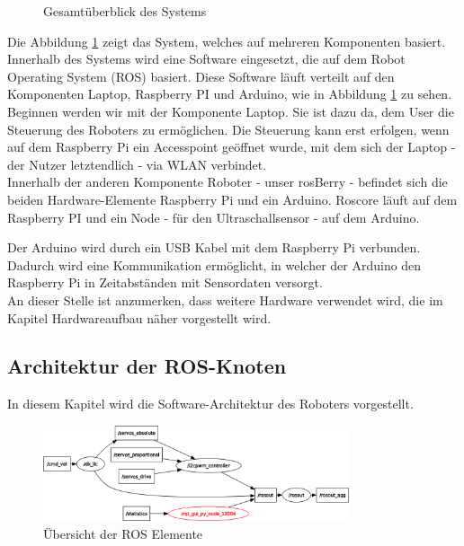 \documentclass[conference]{IEEEtran}
\begin{document}
	\begin{figure}[!ht]
		\centering
		\def\svgwidth{9cm}
		
		\caption{Gesamtüberblick des Systems}
		\label{Gesamtzusammenhang}
	\end{figure}
	Die Abbildung \ref{Gesamtzusammenhang} zeigt das System, welches auf mehreren Komponenten basiert.
	Innerhalb des Systems wird eine Software eingesetzt, die auf dem Robot Operating System (ROS) basiert.
	Diese Software läuft verteilt auf den Komponenten Laptop, Raspberry PI und Arduino, wie in Abbildung \ref{Gesamtzusammenhang} zu sehen.
	\\
	Beginnen werden wir mit der Komponente Laptop.
	Sie ist dazu da, dem User die Steuerung des Roboters zu ermöglichen.
	Die Steuerung kann erst erfolgen, wenn auf dem Raspberry Pi ein Accesspoint geöffnet wurde, mit dem sich der Laptop - der Nutzer letztendlich - via WLAN verbindet.
	\\
	Innerhalb der anderen Komponente Roboter - unser rosBerry - befindet sich die beiden Hardware-Elemente Raspberry Pi und ein Arduino. Roscore läuft auf dem Raspberry PI und ein Node - für den Ultraschallsensor - auf dem Arduino.
	
	Der Arduino wird durch ein USB Kabel mit dem Raspberry Pi verbunden.
	Dadurch wird eine Kommunikation ermöglicht, in welcher der Arduino den Raspberry Pi in Zeitabständen mit Sensordaten versorgt.
	\\
	An dieser Stelle ist anzumerken, dass weitere Hardware verwendet wird, die im Kapitel Hardwareaufbau näher vorgestellt wird.
	
	\subsection{Architektur der ROS-Knoten}\label{sec:Architektur}
	
	In diesem Kapitel wird die Software-Architektur des Roboters vorgestellt.
	
	\begin{figure}[!ht] 
		\centering
		\includegraphics[width=9cm]{img/rosgraph.png}
		\caption{Übersicht der ROS Elemente}
		\label{rosgraph}
	\end{figure}
	
\end{document}

